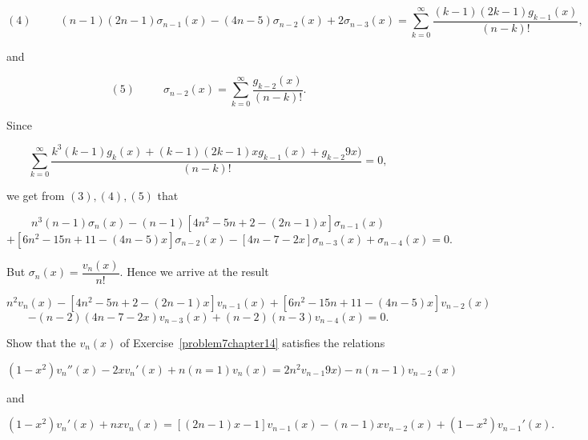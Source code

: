 \begin{solution}
$$(4) \hspace{30pt} (n-1)(2n-1)\sigma_{n-1}(x)-(4n-5)\sigma_{n-2}(x)+2\sigma_{n-3}(x) = \displaystyle\sum_{k=0}^{\infty} \dfrac{(k-1)(2k-1)g_{k-1}(x)}{(n-k)!},$$

and

$$(5) \hspace{30pt} \sigma_{n-2}(x) = \displaystyle\sum_{k=0}^{\infty} \dfrac{g_{k-2}(x)}{(n-k)!}.$$

Since

$$\displaystyle\sum_{k=0}^{\infty} \dfrac{k^3(k-1)g_k(x)+(k-1)(2k-1)xg_{k-1}(x) + g_{k-2}9x)}{(n-k)!}=0,$$

we get from $(3),(4),(5)$ that

$$n^3(n-1)\sigma_n(x)-(n-1)[4n^2-5n+2-(2n-1)x]\sigma_{n-1}(x)$$
$$+[6n^2-15n+11-(4n-5)x]\sigma_{n-2}(x) - [4n-7-2x]\sigma_{n-3}(x) + \sigma_{n-4}(x)=0.$$

But $\sigma_n(x) = \dfrac{v_n(x)}{n!}$. Hence we arrive at the result

$$n^2v_n(x) - [4n^2-5n+2-(2n-1)x]v_{n-1}(x)+[6n^2-15n+11-(4n-5)x]v_{n-2}(x)$$
$$-(n-2)(4n-7-2x)v_{n-3}(x)+(n-2)(n-3)v_{n-4}(x)=0.$$
\end{solution}
\begin{problem}\label{problem8chapter14}
Show that the $v_n(x)$ of Exercise~\ref{problem7chapter14} satisfies the relations

$$(1-x^2)v_n''(x)-2xv_n'(x)+n(n=1)v_n(x)=2n^2v_{n-1}9x)-n(n-1)v_{n-2}(x)$$

and

$$(1-x^2)v_n'(x)+nxv_n(x) = [(2n-1)x-1]v_{n-1}(x)-(n-1)xv_{n-2}(x)+(1-x^2)v_{n-1}'(x).$$
\end{problem}
